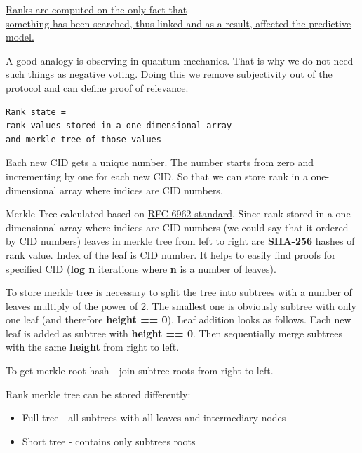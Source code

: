 \documentclass[10pt,oneside]{amsart}
\newcommand{\code}[1]{\textbf{#1}}
\newenvironment{Figure}
  {\par\medskip\noindent\minipage{\linewidth}}
  {\endminipage\par\medskip}
\begin{document}
\begin{displayquote}
\underline{Ranks are computed on the only fact that}\\
\underline{something has been searched, thus linked and as a result, affected the predictive model.}
\end{displayquote}
A good analogy is observing in quantum mechanics. That is why we do not need such things as negative voting. Doing this we remove subjectivity out of the protocol and can define proof of relevance.

\begin{lstlisting}
Rank state =
rank values stored in a one-dimensional array
and merkle tree of those values
\end{lstlisting}

Each new CID gets a unique number. The number starts from zero and incrementing by one for each new CID. So that we can store rank in a one-dimensional array where indices are CID numbers.

Merkle Tree calculated based on 
\href{https://tools.ietf.org/html/rfc6962#section-2.1}{RFC-6962 standard}. Since rank stored in a one-dimensional array where indices are CID numbers (we could say that it ordered by CID numbers) leaves in merkle tree from left to right are \code{SHA-256} hashes of rank value. Index of the leaf is CID number. It helps to easily find proofs for specified CID (\code{log n} iterations where \code{n} is a number of leaves).

To store merkle tree is necessary to split the tree into subtrees with a number of leaves multiply of the power of 2. The smallest one is obviously subtree with only one leaf (and therefore \code{height == 0}). Leaf addition looks as follows. Each new leaf is added as subtree with \code{height == 0}.
Then sequentially merge subtrees with the same \code{height} from right to left.



To get merkle root hash - join subtree roots from right to left.

Rank merkle tree can be stored differently:

\begin{itemize}
\item[] Full tree - all subtrees with all leaves and intermediary nodes
\item[] Short tree - contains only subtrees roots
\end{itemize}
\end{document}
